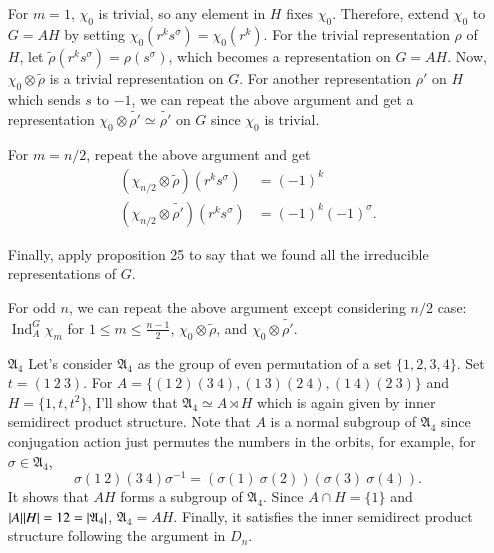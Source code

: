 \documentclass[a4paper, 12pt]{article}
\theoremstyle{Mydefinition}
\theoremstyle{Mytheorem}
\DeclareMathOperator{\Ind}{Ind}
\begin{document}
\begin{enumerate}
    For $m=1$, $\chi_0$ is trivial, so any element in $H$ fixes $\chi_0$. Therefore, extend $\chi_0$ to $G= AH$ by setting $\chi_0(r^ks^\sigma) = \chi_0(r^k)$. For the trivial representation $\rho$ of $H$, let $\tilde{\rho}(r^ks^\sigma) = \rho(s^\sigma)$, which becomes a representation on $G = AH$. Now, $\chi_0\otimes \tilde{\rho}$ is a trivial representation on $G$. For another representation $\rho'$ on $H$ which sends $s$ to $-1$, we can repeat the above argument and get a representation $\chi_0\otimes \tilde{\rho'}\simeq \tilde{\rho'}$ on $G$ since $\chi_0$ is trivial.
    
    For $m=n/2$, repeat the above argument and get
    \begin{equation}
    \begin{split}
        \left(\chi_{n/2}\otimes \tilde{\rho}\right)(r^ks^\sigma) &= (-1)^k\\
        \left(\chi_{n/2}\otimes \tilde{\rho'}\right)(r^ks^\sigma) &= (-1)^k(-1)^\sigma.
    \end{split}
    \end{equation}
    
    Finally, apply proposition 25 to say that we found all the irreducible representations of $G$.
    
    For odd $n$, we can repeat the above argument except considering $n/2$ case: $\Ind_A^G \chi_m$ for $1\leq m\leq \frac{n-1}{2}$, $\chi_0\otimes \tilde{\rho}$, and $\chi_0\otimes \tilde{\rho'}$.
    
    \item[$\mathfrak{A}_4$] Let's consider $\mathfrak{A}_4$ as the group of even permutation of a set $\{1,2,3,4\}$. Set $t = (1~2~3)$. For $A = \{(1~2)(3~4),(1~3)(2~4),(1~4)(2~3)\}$ and $H = \{1,t,t^2\}$, I'll show that $\mathfrak{A}_4 \simeq A\rtimes H$ which is again given by inner semidirect product structure. Note that $A$ is a normal subgroup of $\mathfrak{A}_4$ since conjugation action just permutes the numbers in the orbits, for example, for $\sigma\in \mathfrak{A}_4$,
    \begin{equation}
        \sigma (1~2)(3~4)\sigma^{-1} = (\sigma(1)~\sigma(2))(\sigma(3)~\sigma(4)).
    \end{equation}
    It shows that $AH$ forms a subgroup of $\mathfrak{A}_4$. Since $A\cap H = \{1\}$ and $\abs{A}\abs{H} = 12 = \abs{\mathfrak{A}_4}$, $\mathfrak{A}_4 = AH$. Finally, it satisfies the inner semidirect product structure following the argument in $D_n$.
    

\end{enumerate}
\end{document}

